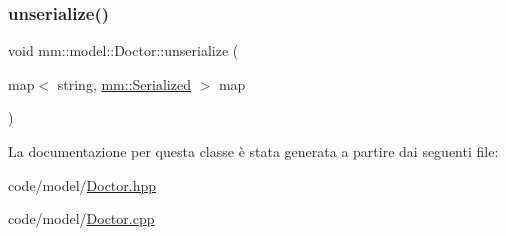 \subsubsection{\texorpdfstring{unserialize()}{unserialize()}}
{\footnotesize\ttfamily void mm\+::model\+::\+Doctor\+::unserialize (\begin{DoxyParamCaption}\item[{map$<$ string, \hyperlink{structmm_1_1_serialized}{mm\+::\+Serialized} $>$}]{map }\end{DoxyParamCaption})\hspace{0.3cm}{\ttfamily [override]}}



La documentazione per questa classe è stata generata a partire dai seguenti file\+:\begin{DoxyCompactItemize}
\item 
code/model/\hyperlink{_doctor_8hpp}{Doctor.\+hpp}\item 
code/model/\hyperlink{_doctor_8cpp}{Doctor.\+cpp}\end{DoxyCompactItemize}
